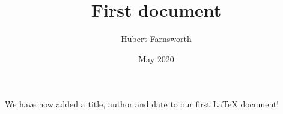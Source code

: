 \documentclass[10pt, A4]{article}
\title{First document}
\author{Hubert Farnsworth}
\date{May 2020}
\begin{document}
\maketitle

We have now added a title, author and date to our first \LaTeX{} document!
\end{document}

